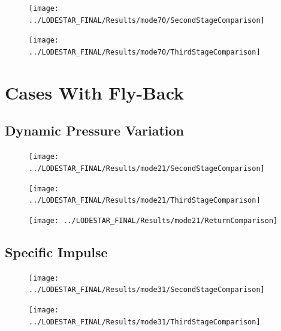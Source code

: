 \begin{figure}[th]
\centering
\texttt{[image: ../LODESTAR\_FINAL/Results/mode70/SecondStageComparison]}
\caption{}
\label{fig:SecondStageComparison8}
\end{figure}


\begin{figure}[th]
\centering
\texttt{[image: ../LODESTAR\_FINAL/Results/mode70/ThirdStageComparison]}
\caption{}
\label{fig:ThirdStageComparison8}
\end{figure}


\section{Cases With Fly-Back}

\subsection{Dynamic Pressure Variation}\label{sec:app_comparison21}
\begin{figure}[th]
\centering
\texttt{[image: ../LODESTAR\_FINAL/Results/mode21/SecondStageComparison]}
\caption{}
\label{fig:SecondStageComparison9}
\end{figure}

\begin{figure}[th]
\centering
\texttt{[image: ../LODESTAR\_FINAL/Results/mode21/ThirdStageComparison]}
\caption{}
\label{fig:ThirdStageComparison9}
\end{figure}

\begin{figure}[th]
\centering
\texttt{[image: ../LODESTAR\_FINAL/Results/mode21/ReturnComparison]}
\caption{}
\label{fig:ReturnComparison}
\end{figure}


\subsection{Specific Impulse}\label{sec:app_comparison31}
\begin{figure}[th]
\centering
\texttt{[image: ../LODESTAR\_FINAL/Results/mode31/SecondStageComparison]}
\caption{}
\label{fig:SecondStageComparison10}
\end{figure}

\begin{figure}[th]
\centering
\texttt{[image: ../LODESTAR\_FINAL/Results/mode31/ThirdStageComparison]}
\caption{}
\label{fig:ThirdStageComparison10}
\end{figure}


